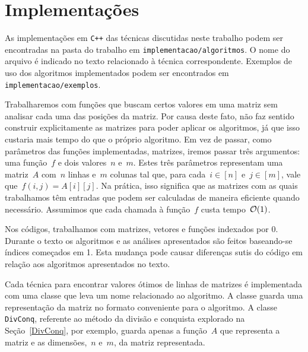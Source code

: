 \section{Implementações} \label{Intro:impl}
As implementações em \texttt{C++} das técnicas discutidas neste trabalho podem ser encontradas na pasta do trabalho em \texttt{implementacao/algoritmos}. O nome do arquivo é indicado no texto relacionado à técnica correspondente. Exemplos de uso dos algoritmos implementados podem ser encontrados em \texttt{implementacao/exemplos}.

Trabalharemos com funções que buscam certos valores em uma matriz sem analisar cada uma das posições da matriz. Por causa deste fato, não faz sentido construir explicitamente as matrizes para poder aplicar os algoritmos, já que isso custaria mais tempo do que o próprio algoritmo. Em vez de passar, como parâmetros das funções implementadas, matrizes, iremos passar três argumentos: uma função~$f$ e dois valores~$n$ e~$m$. Estes três parâmetros representam uma matriz~$A$ com~$n$ linhas e~$m$ colunas tal que, para cada~${ i \in [n] }$ e~${ j \in [m] }$, vale que~${ f(i,j) = A[i][j] }$. Na prática, isso significa que as matrizes com as quais trabalhamos têm entradas que podem ser calculadas de maneira eficiente quando necessário. Assumimos que cada chamada à função~$f$ custa tempo~$\mathcal{O}(1)$.

Nos códigos, trabalhamos com matrizes, vetores e funções indexados por 0. Durante o texto os algoritmos e as análises apresentados são feitos baseando-se índices começados em 1. Esta mudança pode causar diferenças sutis do código em relação aos algoritmos apresentados no texto.

Cada técnica para encontrar valores ótimos de linhas de matrizes é implementada com uma classe que leva um nome relacionado ao algoritmo. A classe guarda uma representação da matriz no formato conveniente para o algoritmo. A classe \texttt{DivConq}, referente ao método da divisão e conquista explorado na Seção~\ref{DivConq}, por exemplo, guarda apenas a função~$A$ que representa a matriz e as dimensões,~$n$ e~$m$, da matriz representada.
